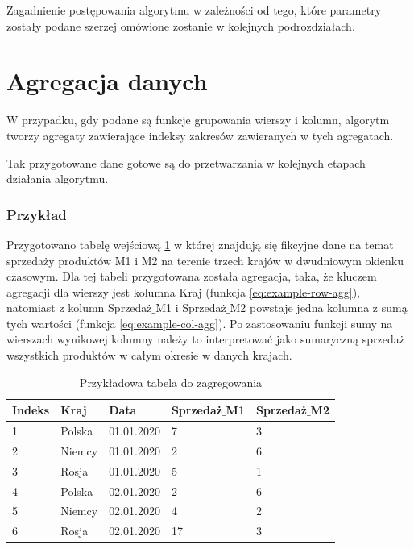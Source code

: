 \documentclass[brudnopis]{xmgr}
\begin{document}
Zagadnienie postępowania algorytmu w zależności od tego, które parametry zostały podane szerzej omówione zostanie w kolejnych podrozdziałach.

\section{Agregacja danych}

W przypadku, gdy podane są funkcje grupowania wierszy i kolumn, algorytm tworzy agregaty zawierające indeksy zakresów zawieranych w tych agregatach.

Tak przygotowane dane gotowe są do przetwarzania w kolejnych etapach działania algorytmu.


\newpage
\subsubsection{Przykład}

Przygotowano tabelę wejściową \ref{tab:example-input} w której znajdują się fikcyjne dane na temat sprzedaży produktów M1 i M2 na terenie trzech krajów w dwudniowym okienku czasowym.
Dla tej tabeli przygotowana została agregacja, taka, że kluczem agregacji dla wierszy jest kolumna Kraj (funkcja \ref{eq:example-row-agg}), natomiast z kolumn Sprzedaż$\_$M1 i Sprzedaż$\_$M2 powstaje jedna kolumna z sumą tych wartości (funkcja \ref{eq:example-col-agg}).
Po zastosowaniu funkcji sumy na wierszach wynikowej kolumny należy to interpretować jako sumaryczną sprzedaż wszystkich produktów w całym okresie w danych krajach.

\begin{table}[!tbh]
\begin{tabular}{|l|l|l|l|l|} \hline
Indeks & Kraj & Data & Sprzedaż$\_$M1 & Sprzedaż$\_$M2 \\ \hline
1 & Polska & 01.01.2020 & 7 & 3 \\ \hline
2 & Niemcy & 01.01.2020 & 2 & 6 \\ \hline
3 & Rosja & 01.01.2020 & 5 & 1 \\ \hline
4 & Polska & 02.01.2020 & 2 & 6 \\ \hline
5 & Niemcy & 02.01.2020 & 4 & 2 \\ \hline
6 & Rosja & 02.01.2020 & 17 & 3 \\ \hline
\end{tabular}
\caption{Przykładowa tabela do zagregowania \label{tab:example-input}}
\end{table}
\end{document}
